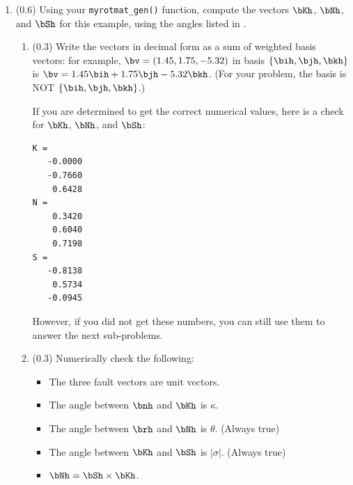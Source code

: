 \documentclass[11pt,titlepage,fleqn]{article}
\newcommand{\rotvec}{\bv}      %
\begin{document}
\begin{enumerate}
\begin{itemize}
\item There should be no numbers in your expressions.

\item Write all expressions {\em without} using negative signs with angles (like $-\kappa$, $-\theta$, or $-\sigma$).

\item See  and the introductory section ``Signed angles'' for an explanation of the conventions for $\sigma$. The convention for the strike angle is clockwise positive.
\end{itemize}


\item (0.6) Using your \verb+myrotmat_gen()+ function, compute the vectors $\bKh$, $\bNh$, and $\bSh$ for this example, using the angles listed in .
%
\begin{enumerate}
\item (0.3) Write the vectors in decimal form as a sum of weighted basis vectors: for example, $\bv = (1.45,1.75,-5.32)$ in basis $\{\bih,\bjh,\bkh\}$ is $\rotvec = 1.45\bih + 1.75\bjh - 5.32\bkh$. (For your problem, the basis is NOT $\{\bih,\bjh,\bkh\}$.)

If you are determined to get the correct numerical values, here is a check for $\bKh$, $\bNh$, and $\bSh$:
%
\begin{verbatim}
K =
   -0.0000
   -0.7660
    0.6428
N =
    0.3420
    0.6040
    0.7198
S =
   -0.8138
    0.5734
   -0.0945
\end{verbatim}
%
However, if you did not get these numbers, you can still use them to answer the next sub-problems.
  
\item (0.3) Numerically check the following:
%
\begin{itemize}
\item The three fault vectors are unit vectors.
\item The angle between $\bnh$ and $\bKh$ is $\kappa$.
\item The angle between $\brh$ and $\bNh$ is $\theta$. (Always true)
\item The angle between $\bKh$ and $\bSh$ is $|\sigma|$. (Always true)
\item $\bNh = \bSh \times \bKh$.
\end{itemize}


\end{enumerate}
\end{enumerate}
\end{document}
